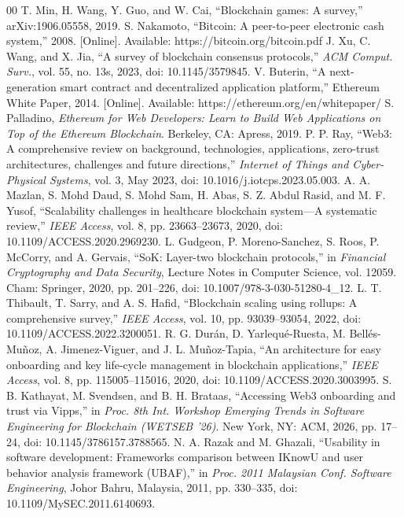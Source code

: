 \documentclass[10pt,conference]{IEEEtran}
\begin{document}
\newpage
\begin{thebibliography}{00}
 T. Min, H. Wang, Y. Guo, and W. Cai, ``Blockchain games: A survey,'' arXiv:1906.05558, 2019.
 S. Nakamoto, ``Bitcoin: A peer-to-peer electronic cash system,'' 2008. [Online]. Available: https://bitcoin.org/bitcoin.pdf
 J. Xu, C. Wang, and X. Jia, ``A survey of blockchain consensus protocols,'' \textit{ACM Comput. Surv.}, vol. 55, no. 13s, 2023, doi: 10.1145/3579845.
 V. Buterin, ``A next-generation smart contract and decentralized application platform,'' Ethereum White Paper, 2014. [Online]. Available: https://ethereum.org/en/whitepaper/
 S. Palladino, \textit{Ethereum for Web Developers: Learn to Build Web Applications on Top of the Ethereum Blockchain}. Berkeley, CA: Apress, 2019.
 P. P. Ray, ``Web3: A comprehensive review on background, technologies, applications, zero-trust architectures, challenges and future directions,'' \textit{Internet of Things and Cyber-Physical Systems}, vol. 3, May 2023, doi: 10.1016/j.iotcps.2023.05.003.
 A. A. Mazlan, S. Mohd Daud, S. Mohd Sam, H. Abas, S. Z. Abdul Rasid, and M. F. Yusof, ``Scalability challenges in healthcare blockchain system---A systematic review,'' \textit{IEEE Access}, vol. 8, pp. 23663--23673, 2020, doi: 10.1109/ACCESS.2020.2969230.
 L. Gudgeon, P. Moreno-Sanchez, S. Roos, P. McCorry, and A. Gervais, ``SoK: Layer-two blockchain protocols,'' in \textit{Financial Cryptography and Data Security}, Lecture Notes in Computer Science, vol. 12059. Cham: Springer, 2020, pp. 201--226, doi: 10.1007/978-3-030-51280-4\_12.
 L. T. Thibault, T. Sarry, and A. S. Hafid, ``Blockchain scaling using rollups: A comprehensive survey,'' \textit{IEEE Access}, vol. 10, pp. 93039--93054, 2022, doi: 10.1109/ACCESS.2022.3200051.
 R. G. Dur\'an, D. Yarlequ\'e-Ruesta, M. Bell\'es-Mu\~noz, A. Jimenez-Viguer, and J. L. Mu\~noz-Tapia, ``An architecture for easy onboarding and key life-cycle management in blockchain applications,'' \textit{IEEE Access}, vol. 8, pp. 115005--115016, 2020, doi: 10.1109/ACCESS.2020.3003995.
 S. B. Kathayat, M. Svendsen, and B. H. Brataas, ``Accessing Web3 onboarding and trust via Vipps,'' in \textit{Proc. 8th Int. Workshop Emerging Trends in Software Engineering for Blockchain (WETSEB '26)}. New York, NY: ACM, 2026, pp. 17--24, doi: 10.1145/3786157.3788565.
 N. A. Razak and M. Ghazali, ``Usability in software development: Frameworks comparison between IKnowU and user behavior analysis framework (UBAF),'' in \textit{Proc. 2011 Malaysian Conf. Software Engineering}, Johor Bahru, Malaysia, 2011, pp. 330--335, doi: 10.1109/MySEC.2011.6140693.

\end{thebibliography}
\end{document}
